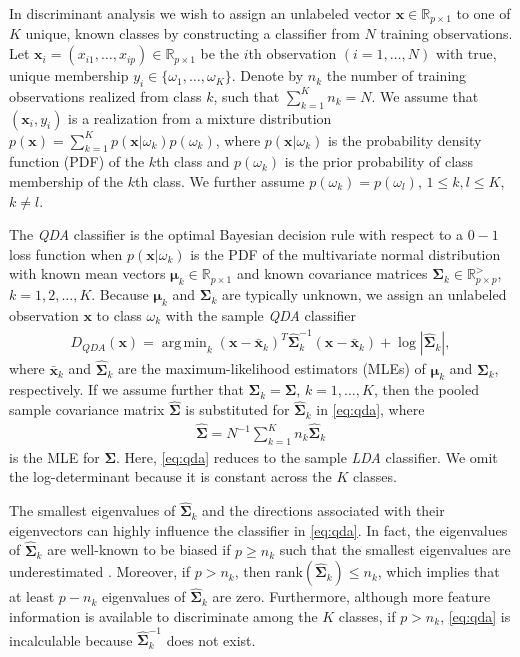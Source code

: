 \documentclass[]{interact}\usepackage[]{graphicx}\usepackage[]{color}
\newcommand{\xbar}{\bar{\bm x}}
\DeclareMathOperator*{\argmin}{arg\,min}
\begin{document}
In discriminant analysis we wish to assign an unlabeled vector $\bm x \in
\mathbb{R}_{p \times 1}$ to one of $K$ unique, known classes by constructing a
classifier from $N$ training observations. Let $\bm x_i = (x_{i1}, \ldots,
x_{ip}) \in \mathbb{R}_{p \times 1}$ be the $i$th observation $(i = 1, \ldots,
N)$ with true, unique membership $y_i \in \{\omega_1, \ldots, \omega_K\}$.
Denote by $n_k$ the number of training observations realized from class $k$,
such that $\sum_{k=1}^K n_k = N$. We assume that $(\bm x_i, y_i)$ is a
realization from a mixture distribution $p(\bm x) = \sum_{k=1}^K p(\bm x |
\omega_k) p(\omega_k)$, where $p(\bm x | \omega_k)$ is the probability density
function (PDF) of the $k$th class and $p(\omega_k)$ is the prior probability of
class membership of the $k$th class. We further assume $p(\omega_k) =
p(\omega_l)$, $1 \le k, l \le K$, $k \ne l$.

The \emph{QDA} classifier is the optimal Bayesian decision rule with respect to
a $0-1$ loss function when $p(\bm x | \omega_k)$ is the PDF of the multivariate
normal distribution with known mean vectors $\bm \mu_k \in \mathbb{R}_{p \times
  1}$ and known covariance matrices $\bm \Sigma_k \in \mathbb{R}_{p \times
  p}^{>}$, $k = 1, 2, \ldots, K$. Because $\bm \mu_k$ and $\bm \Sigma_k$ are
typically unknown, we assign an unlabeled observation $\bm x$ to class
$\omega_k$ with the sample \emph{QDA} classifier
\begin{align}
	D_{QDA}(\bm x) = \argmin_{k} (\bm x - \xbar_k)^{T}\widehat{\bm
    \Sigma}_k^{-1}(\bm x - \xbar_k) + \log |\widehat{\bm \Sigma}_k|, \label{eq:qda}
\end{align}
where $\xbar_k$ and $\widehat{\bm \Sigma}_k$ are the maximum-likelihood
estimators (MLEs) of $\bm \mu_k$ and $\bm \Sigma_k$, respectively. If we assume
further that $\bm \Sigma_k = \bm \Sigma$, $k = 1, \ldots, K$, then the pooled
sample covariance matrix $\widehat{\bm \Sigma}$ is substituted for $\widehat{
  \bm \Sigma}_k$ in \eqref{eq:qda}, where
\begin{align}
	\widehat{\bm \Sigma} = N^{-1} \sum_{k=1}^K n_k \widehat{\bm \Sigma}_k \label{eq:pooled-cov}
\end{align}
is the MLE for $\bm \Sigma$. Here, \eqref{eq:qda} reduces to the sample
\emph{LDA} classifier. We omit the log-determinant because it is constant across
the $K$ classes.

The smallest eigenvalues of $\widehat{\bm \Sigma}_k$ and the directions
associated with their eigenvectors can highly influence the classifier in
\eqref{eq:qda}. In fact, the eigenvalues of $\widehat{ \bm \Sigma}_k$ are
well-known to be biased if $p \ge n_k$ such that the smallest eigenvalues are
underestimated \citep{Seber:2004uh}. Moreover, if $p > n_k$, then
rank$(\widehat{\bm \Sigma}_k) \le n_k$, which implies that at least $p - n_k$
eigenvalues of $\widehat{\bm \Sigma}_k$ are zero. Furthermore, although more
feature information is available to discriminate among the $K$ classes, if $p >
n_k$, \eqref{eq:qda} is incalculable because $\widehat{\bm \Sigma}_k^{-1}$ does
not exist.
\end{document}
